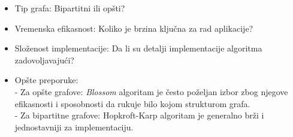 \documentclass[11pt,a4paper]{article}
\theoremstyle{definition}
\begin{document}
\begin{tcolorbox}[width=393pt,colback={myblue},title={Ključna razmatranja za izbor algoritma},colbacktitle=mygray,coltitle=black,boxrule=0.5pt,boxsep=3pt]  
\begin{itemize}  
\item Tip grafa: Bipartitni ili opšti?
\item Vremenska efikasnost: Koliko je brzina ključna za rad aplikacije? 
\item Složenost implementacije: Da li su detalji implementacije algoritma zadovoljavajući?
\item Opšte preporuke:\\
- Za opšte grafove: \textit{Blossom} algoritam je često poželjan izbor zbog njegove efikasnosti i sposobnosti da rukuje bilo kojom strukturom grafa.\\
- Za bipartitne grafove: Hopkroft-Karp algoritam je generalno brži i jednostavniji za implementaciju.
\end{itemize}
\end{tcolorbox} 
\newpage
\end{document}
